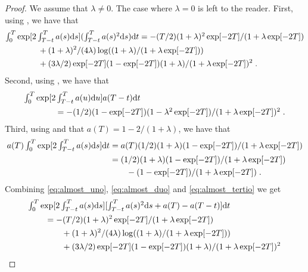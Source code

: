   \begin{proof}
    We assume that $\lambda \neq 0$. The case where $\lambda = 0$ is left to the
    reader.  First, using , we have that
    \begin{align}
          &\textstyle{\int_0^T \exp[2\int_{T-t}^T a(s) \mathrm{d}s] (\int_{T-t}^T a(s)^2 \mathrm{d}s) \mathrm{d}t} = - (T/2)(1+\lambda)^2\exp[-2T]/(1+\lambda\exp[-2T]) \\
                                                                                             & \qquad \qquad + (1+\lambda)^2/(4\lambda)\log((1+\lambda)/(1 + \lambda \exp[-2T])) \\
          & \qquad \qquad +(3\lambda/2)\exp[-2T](1-\exp[-2T])(1+\lambda)/(1 + \lambda \exp[-2T])^2 \; .
              \label{eq:almost_uno}
    \end{align}
  Second, using , we have that
  \begin{align}
        &\textstyle{
      \int_0^T \exp[ 2\int_{T-t}^T a(u) \mathrm{d}u] a(T-t) \mathrm{d}t} \\
    & \qquad \qquad \textstyle{= -(1/2)(1- \exp[-2T])(1 - \lambda^2 \exp[-2T])/(1 + \lambda \exp[-2T])^2 \;. \label{eq:almost_duo}
      }
  \end{align}
  Third, using  and that $a(T) = 1 -2/(1+\lambda)$, we have that
  \begin{align}
    \textstyle{
    a(T) \int_0^T \exp[2\int_{T-t}^T a(s) \mathrm{d}s] \mathrm{d}t} &= a(T) \textstyle{(1/2)(1+\lambda)  (1 -  \exp[-2T])/(1 + \lambda \exp[-2T])  }\\
                                                          &=(1/2)(1+\lambda)  (1 -  \exp[-2T])/(1 + \lambda \exp[-2T]) \\
    & \qquad  -  (1 -  \exp[-2T])/(1 + \lambda \exp[-2T]) \; .\label{eq:almost_tertio}
  \end{align}
  Combining \eqref{eq:almost_uno}, \eqref{eq:almost_duo} and \eqref{eq:almost_tertio} we get
\begin{align}
  &\textstyle{\int_0^T \exp[2\int_{T-t}^T a(s) \rmd s] [\int_{T-t}^T a(s)^2 \rmd s + a(T) - a(T-t)] \rmd t } \\
  & \qquad = - (T/2)(1+\lambda)^2\exp[-2T]/(1+\lambda\exp[-2T]) \\
   & \qquad \qquad + (1+\lambda)^2/(4\lambda)\log((1+\lambda)/(1 + \lambda \exp[-2T])) \\
   & \qquad \qquad +(3\lambda/2)\exp[-2T](1-\exp[-2T])(1+\lambda)/(1 + \lambda \exp[-2T])^2 \\

\end{align}
\end{proof}
